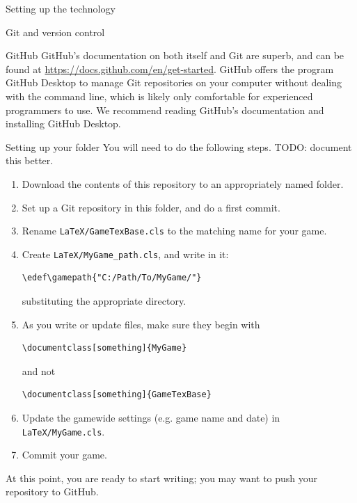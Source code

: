 \documentclass[sheet]{GameTexBase}
\begin{document}
\begin{section}{Setting up the technology}
\begin{subsection}{Git and version control}
\begin{subsubsection}{GitHub}
GitHub's documentation on both itself and Git are superb, and can be found at \url{https://docs.github.com/en/get-started}.  GitHub offers the program GitHub Desktop to manage Git repositories on your computer without dealing with the command line, which is likely only comfortable for experienced programmers to use.  We recommend reading GitHub's documentation and installing GitHub Desktop.
\end{subsubsection}
\end{subsection}
\begin{subsection}{Setting up your \gametex{} folder}
You will need to do the following steps.  TODO: document this better.
\begin{enumerate}
\item Download the contents of this repository to an appropriately named folder.
\item Set up a Git repository in this folder, and do a first commit.
\item Rename \lstinline|LaTeX/GameTexBase.cls| to the matching name for your game.
\item Create \lstinline|LaTeX/MyGame_path.cls|, and write in it:
\begin{verbatim}
\edef\gamepath{"C:/Path/To/MyGame/"}
\end{verbatim}
substituting the appropriate directory.
\item As you write or update files, make sure they begin with
\begin{verbatim}
\documentclass[something]{MyGame}
\end{verbatim}
and not
\begin{verbatim}
\documentclass[something]{GameTexBase}
\end{verbatim}
\item Update the gamewide settings (e.g. game name and date) in \lstinline|LaTeX/MyGame.cls|.
\item Commit your game.
\end{enumerate}
At this point, you are ready to start writing; you may want to push your repository to GitHub.
\end{subsection}
\end{section}
\end{document}
